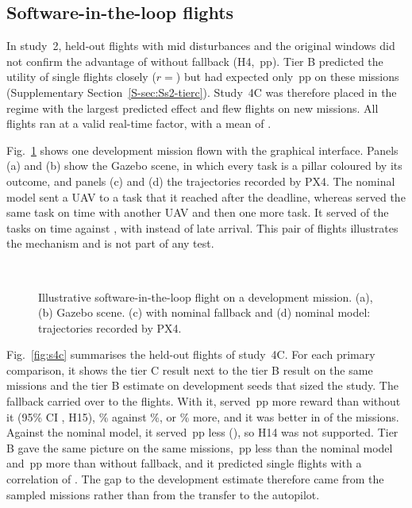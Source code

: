 
\subsection{Software-in-the-loop flights}\label{sec:s2-tierc}
In study~2,  held-out flights with mid disturbances and the original windows did not confirm the advantage
of \mname{} without fallback (H4, \,pp). Tier B predicted the utility of single flights closely
($r={}$) but had expected only \,pp on these missions (Supplementary
Section~\ref{S-sec:Ss2-tierc}). Study~4C was therefore placed in the regime with the largest predicted effect and flew
 flights on  new missions. All flights ran at a valid real-time factor, with a mean of
.

Fig.~\ref{fig:demo} shows one development mission flown with the graphical interface. Panels (a) and (b) show the
Gazebo scene, in which every task is a pillar coloured by its outcome, and panels (c) and (d) the trajectories recorded
by PX4. The nominal model sent a UAV to a task that it reached after the deadline, whereas \mname{} served the same
task on time with another UAV and then one more task. It served  of the  tasks on
time against , with  instead of  late arrival. This pair of
flights illustrates the mechanism and is not part of any test.

\begin{figure}[t]
\centering
{}\\[2pt]
\caption{Illustrative software-in-the-loop flight on a development mission. (a), (b) Gazebo scene. (c) \mname{} with
nominal fallback and (d) nominal model: trajectories recorded by PX4.}\label{fig:demo}
\end{figure}

Fig.~\ref{fig:s4c} summarises the held-out flights of study~4C. For each primary comparison, it shows the tier C
result next to the tier B result on the same missions and the tier B estimate on development seeds that sized the
study. The fallback carried over to the flights. With it, \mname{} served \,pp more reward than
without it (95\% CI , H15), \% against \%, or \% more, and it was
better in  of the  missions. Against the nominal model, it served \,pp less
(), so H14 was not supported. Tier B gave the same picture on the same missions, \,pp
less than the nominal model and \,pp more than without fallback, and it predicted single flights
with a correlation of . The gap to the development estimate therefore came from the sampled missions rather
than from the transfer to the autopilot.

